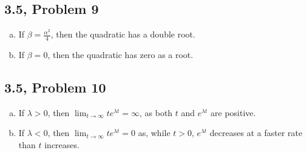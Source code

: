 \documentclass[10pt]{mypackage}
\begin{document}
\subsection{3.5, Problem 9}%
\begin{enumerate}[(a)]
  \item If $\beta = \frac{\alpha^2}{4}$, then the quadratic has a double root.
  \item If $\beta = 0$, then the quadratic has zero as a root.
\end{enumerate}
\subsection{3.5, Problem 10}
\begin{enumerate}[(a)]
  \item If $\lambda > 0$, then $\lim_{t\rightarrow\infty}te^{\lambda t} = \infty$, as both $t$ and $e^{\lambda t}$ are positive.
  \item If $\lambda < 0$, then $\lim_{t\rightarrow\infty}te^{\lambda t} = 0$ as, while $t > 0$, $e^{\lambda t}$ decreases at a faster rate than $t$ increases.
\end{enumerate}
\end{document}
